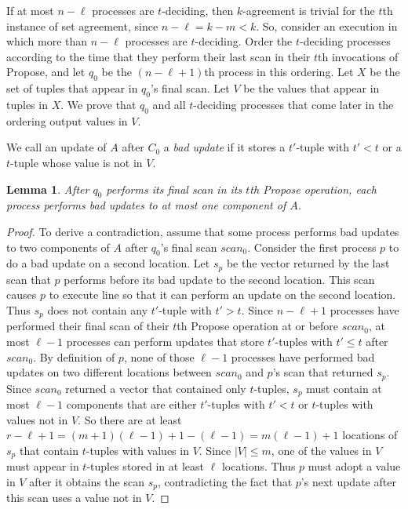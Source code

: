 \documentclass[11pt]{article}
\newtheorem{lemma}[theorem]{Lemma}
\newcounter{linenum}
\newcounter{ind}
\newcommand{\lref}[1]{\linenumref{#1}}
\begin{document}
If at most $n-\ell$ processes are $t$-deciding, then $k$-agreement is trivial for the $t$th instance of set agreement, since
$n-\ell = k-m < k$.
So, consider an execution in which more than $n-\ell$ processes are $t$-deciding.
Order the $t$-deciding processes according to the time that they perform their last scan in their $t$th invocations of {\sc Propose},
and let $q_0$ be the $(n-\ell+1)$th process in this ordering.
Let $X$ be the set of tuples that appear in $q_0$'s final scan.
Let $V$ be the values that appear in tuples in $X$.
We prove that $q_0$ and all $t$-deciding processes that come later in the ordering
output values in $V$.

We call an update of $A$ after $C_0$ a {\it bad update} if it stores
a $t'$-tuple with $t'<t$ or a $t$-tuple whose value is not in $V$.

\begin{lemma}
After $q_0$ performs its final scan in its $t$th {\sc Propose} operation, each process performs bad updates to at most one 
component of $A$.
\end{lemma}
\begin{proof}
To derive a contradiction, assume that some process performs bad updates to two components of $A$ 
after $q_0$'s final scan $scan_0$.
Consider the first process $p$ to do a bad update on a second location.
Let $s_p$ be the vector returned by the last scan that $p$ performs before its bad update to the second location.
This scan causes $p$ to execute line \lref{change-index-anon}
so that it can perform an update on the second location.
Thus $s_p$ does not contain any $t'$-tuple with $t'>t$.
Since $n-\ell+1$ processes have performed their final scan of their $t$th {\sc Propose}
operation at or before $scan_0$, at most $\ell-1$ processes can perform
updates that store $t'$-tuples with $t'\leq t$ after $scan_0$.
By definition of $p$, none of those $\ell-1$ processes 
have performed bad updates on two different locations between
$scan_0$ and  $p$'s scan that returned $s_p$.
Since $scan_0$ returned a vector that contained only $t$-tuples, $s_p$ must contain at most $\ell-1$ components
that are either $t'$-tuples with $t'<t$ or $t$-tuples with values not in $V$.
So there are at least $r-\ell+1 = (m+1)(\ell-1)+1-(\ell-1)=m(\ell-1)+1$ locations of $s_p$ that contain $t$-tuples with values in $V$.
Since $|V|\leq m$, one of the values in $V$ must appear in $t$-tuples stored in at least $\ell$ locations.
Thus $p$ must adopt a value in $V$ after it obtains the scan $s_p$, contradicting
the fact that $p$'s next update after this scan uses a value not in $V$.
\end{proof}
\end{document}
